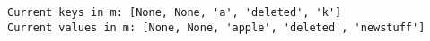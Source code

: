 \documentclass[11pt]{article}
\begin{document}
    \begin{Verbatim}[commandchars=\\\{\}]
Current keys in m: [None, None, 'a', 'deleted', 'k']
Current values in m: [None, None, 'apple', 'deleted', 'newstuff']

    \end{Verbatim}


    
    
    
    
\end{document}
